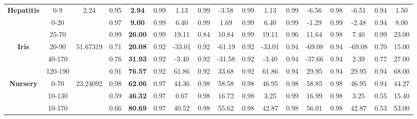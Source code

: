 \documentclass[letterpaper]{article}
\theoremstyle{definition}
\begin{document}
\begin{table}
\begin{tabular}{|c|c|c|c|c|c|c|c|c|c|c|c|c|c|c|c|c|}
\multirow{3}{*}{\textbf{Hepatitis}} & 0-9       & 2.24      & 0.95  & \textbf{2.94}    & 0.99      & 1.13         & 0.99   & -3.58             & 0.99      & 1.13         & 0.99   & -6.56           & 0.98     & -6.51              & 0.94   & 1.50             \\ \cline{2-17} 
                                    & 0-20      &           & 0.97  & \textbf{9.00}    & 0.99      & 6.40         & 0.99   & 1.69              & 0.99      & 6.40         & 0.99   & -1.29           & 0.99     & -2.48              & 0.94   & 8.00             \\ \cline{2-17} 
                                    & 25-70     &           & 0.99  & \textbf{26.00}   & 0.99      & 19.11        & 0.84   & 10.84             & 0.99      & 19.11        & 0.96   & 11.64           & 0.98     & 7.40               & 0.99   & 23.00            \\ \hline
\multirow{3}{*}{\textbf{Iris}}      & 20-90     & 51.67319  & 0.71  & \textbf{20.08}   & 0.92      & -33.01       & 0.92   & -61.19            & 0.92      & -33.01       & 0.94   & -69.08          & 0.94     & -69.08             & 0.70   & 15.00            \\ \cline{2-17} 
                                    & 40-170    &           & 0.76  & \textbf{31.93}   & 0.92      & -3.40        & 0.92   & -31.58            & 0.92      & -3.40        & 0.94   & -37.66          & 0.94     & 2.39               & 0.77   & 27.00            \\ \cline{2-17} 
                                    & 120-190   &           & 0.91  & \textbf{76.57}   & 0.92      & 61.86        & 0.92   & 33.68             & 0.92      & 61.86        & 0.94   & 29.95           & 0.94     & 29.95              & 0.94   & 68.00            \\ \hline
\multirow{3}{*}{\textbf{Nursery}}   & 0-70      & 23.24092  & 0.98  & \textbf{62.06}   & 0.97      & 44.36        & 0.98   & 58.58             & 0.98      & 46.95        & 0.98   & 58.85           & 0.98     & 46.95              & 0.94   & 44.27            \\ \cline{2-17} 
                                    & 10-130    &           & 0.59  & \textbf{46.32}   & 0.97      & 0.67         & 0.98   & 16.72             & 0.98      & 3.25         & 0.99   & 16.99           & 0.98     & 3.25               & 0.55   & 15.40            \\ \cline{2-17} 
                                    & 10-170    &           & 0.66  & \textbf{80.69}   & 0.97      & 40.52        & 0.98   & 55.62    & 0.98      & 42.87        & 0.98   & 56.01  & 0.98     & 42.87     & 0.53   & 53.00            \\ \hline

\end{tabular}
\end{table}
\end{document}
